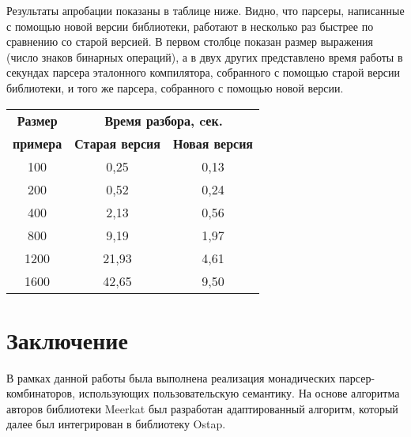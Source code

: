 \documentclass[conference]{IEEEtran}
\begin{document}
Результаты апробации показаны в таблице ниже. Видно, что парсеры, написанные с помощью новой версии библиотеки, работают в несколько раз быстрее по сравнению со старой версией.
В первом столбце показан размер выражения (число знаков бинарных операций), а в двух других представлено время работы в секундах парсера эталонного компилятора, собранного с помощью старой версии библиотеки, и того же парсера, собранного с помощью новой версии.

\begin{table}[htbp]
\begin{center}
\begin{tabular}{|c|c|c|}
\hline
\textbf{Размер} & \multicolumn{2}{|c|}{\textbf{Время разбора, cек.}} \\
\cline{2-3}
\textbf{примера} & \textbf{Старая версия} & \textbf{Новая версия} \\
\hline
100& 0,25& 0,13 \\
\hline
200& 0,52& 0,24 \\
\hline
400& 2,13& 0,56 \\
\hline
800& 9,19& 1,97 \\
\hline
1200& 21,93& 4,61 \\
\hline
1600& 42,65& 9,50 \\
\hline
\end{tabular}
\vskip3mm
\label{tab1}
\end{center}\vspace{-10mm}
\end{table}


\section{Заключение}

В рамках данной работы была выполнена реализация монадических парсер-комбинаторов, использующих пользовательскую семантику. На основе алгоритма авторов библиотеки Meerkat был разработан адаптированный алгоритм, который далее был интегрирован в библиотеку Ostap.
\end{document}
